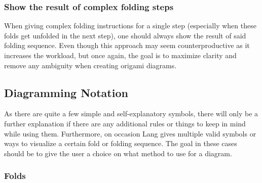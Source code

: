 \subsubsection*{Show the result of complex folding steps}
When giving complex folding instructions for a single step (especially when these folds get unfolded in the next step), one should always show the result of said folding sequence. Even though this approach may seem counterproductive as it increases the workload, but once again, the goal is to maximize clarity and remove any ambiguity when creating origami diagrams.

\newpage
\subsection{Diagramming Notation}
\label{sec:notation}

As there are quite a few simple and self-explanatory symbols, there will only be a further explanation if there are any additional rules or things to keep in mind while using them. Furthermore, on occasion Lang gives multiple valid symbols or ways to visualize a certain fold or folding sequence. The goal in these cases should be to give the user a choice on what method to use for a diagram. 

\subsubsection{Folds}
\label{sec:folds}

